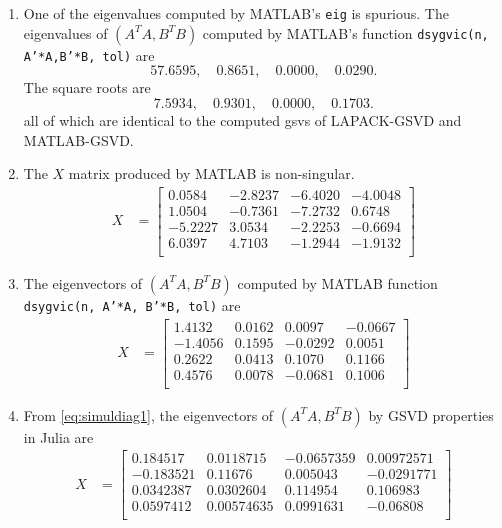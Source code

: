 \begin{example}
{\begin{enumerate}[(1).]
\begin{enumerate}
\item One of the eigenvalues computed by MATLAB's {\tt eig} is spurious. The eigenvalues of $(A^T A, B^T B)$ computed by MATLAB's function {\tt dsygvic(n, A'*A,B'*B, tol)} are
\[
57.6595, \quad
0.8651, \quad
0.0000, \quad
0.0290.
\]
The square roots are  
\[
7.5934, \quad
0.9301, \quad                  
0.0000,\quad                
0.1703.
\] 
all of which are identical to the computed gsvs of LAPACK-GSVD and MATLAB-GSVD.
\item The $X$ matrix produced by MATLAB is non-singular.
	\begin{align*}
    X &= \begin{bmatrix}
        0.0584 &  -2.8237 &  -6.4020 &  -4.0048 \\
    	1.0504 & -0.7361 &  -7.2732 &   0.6748 \\
   		-5.2227 &   3.0534  & -2.2253 &  -0.6694 \\
    	6.0397  &  4.7103 &  -1.2944 &  -1.9132 \\
    \end{bmatrix}
	\end{align*} 
\item The eigenvectors of $(A^TA, B^T B)$ computed by 
MATLAB function {\tt dsygvic(n, A'*A, B'*B, tol)} are
\begin{align*}
    X &= \begin{bmatrix}
    	1.4132 &   0.0162  &  0.0097 &  -0.0667 \\
   		-1.4056 &   0.1595 &  -0.0292 &   0.0051 \\
    	0.2622  &  0.0413 &   0.1070  &  0.1166 \\
    	0.4576  &  0.0078  &  -0.0681 &   0.1006 \\
    \end{bmatrix}
\end{align*}  
\item From \eqref{eq:simuldiag1}, the eigenvectors of $(A^TA, B^T B)$ by GSVD properties
in Julia are
\begin{align*}
    X &= \begin{bmatrix}
  		0.184517 &  0.0118715 &  -0.0657359  & 0.00972571 \\
 		-0.183521 &  0.11676   &   0.005043  & -0.0291771 \\
  		0.0342387 & 0.0302604  &  0.114954   & 0.106983 \\
  		0.0597412 & 0.00574635 &  0.0991631 & -0.06808 \\
    \end{bmatrix}
\end{align*}  
\end{enumerate}        


\end{enumerate}}
\end{example}
